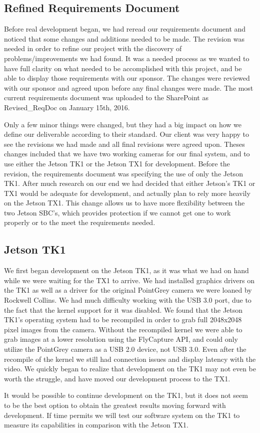 \documentclass[letterpaper,10pt,titlepage]{IEEEtran}
\begin{document}
   \subsection{Refined Requirements Document}
   Before real development began, we had reread our requirements document and noticed that some changes and additions needed to be made. The revision was needed in order to refine our project with the discovery of problems/improvements we had found. It was a needed process as we wanted to have full clarity on what needed to be accomplished with this project, and be able to display those requirements with our sponsor. The changes were reviewed with our sponsor and agreed upon before any final changes were made. The most current requirements document was uploaded to the SharePoint as Revised\_ReqDoc on January 15th, 2016.\\ 
\par
Only a few minor things were changed, but they had a big impact on how we define our deliverable according to their standard. Our client was very happy to see the revisions we had made and all final revisions were agreed upon. Theses changes included that we have two working cameras for our final system, and to use either the Jetson TK1 or the Jetson TX1 for development. Before the revision, the requirements document was specifying the use of only the Jetson TK1. After much research on our end we had decided that either Jetson's TK1 or TX1 would be adequate for development, and actually plan to rely more heavily on the Jetson TX1. This change allows us to have more flexibility between the two Jetson SBC's, which provides protection if we cannot get one to work properly or to the meet the requirements needed. 
   
   \subsection{Jetson TK1}
   We first began development on the Jetson TK1, as it was what we had on hand while we were waiting for the TX1 to arrive. We had installed graphics drivers on the TK1 as well as a driver for the original PointGrey camera we were loaned by Rockwell Collins. We had much difficulty working with the USB 3.0 port, due to the fact that the kernel support for it was disabled. We found that the Jetson TK1's operating system had to be recompiled in order to grab full 2048x2048 pixel images from the camera. Without the recompiled kernel we were able to grab images at a lower resolution using the FlyCapture API, and could only utilize the PointGrey camera as a USB 2.0 device, not USB 3.0. Even after the recompile of the kernel we still had connection issues and display latency with the video. We quickly began to realize that development on the TK1 may not even be worth the struggle, and have moved our development process to the TX1.\\ 
\par
It would be possible to continue development on the TK1, but it does not seem to be the best option to obtain the greatest results moving forward with development. If time permits we will test our software system on the TK1 to measure its capabilities in comparison with the Jetson TX1.
   
\end{document}
